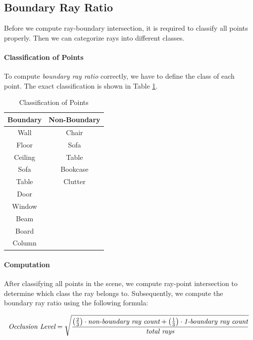 \documentclass[11pt, a4paper,oneside,chapterprefix=false]{scrbook}
\begin{document}
\subsection{Boundary Ray Ratio} \label{sec:boundary ray ratio}

Before we compute ray-boundary intersection, it is required to classify all points properly. Then we can categorize rays into different classes.

\paragraph{Classification of Points} To compute \emph{boundary ray ratio} correctly, we have to define the class of each point. The exact classification is shown in Table \ref{tab:classification of points}.
\begin{table}[H]
    \centering
    \begin{tabular}{|c|c|}
        \hline
        \textbf{Boundary} & \textbf{Non-Boundary} \\
        \hline
        Wall & Chair \\
        Floor & Sofa \\
        Ceiling & Table \\
        Sofa & Bookcase \\
        Table & Clutter \\
        Door &  \\
        Window & \\
        Beam & \\
        Board & \\
        Column & \\
        \hline
    \end{tabular}
    \caption{Classification of Points}
    \label{tab:classification of points}
\end{table}

\paragraph{Computation}

After classifying all points in the scene, we compute ray-point intersection to determine which class the ray belongs to. Subsequently, we compute the boundary ray ratio using the following formula:

\[
\emph{{Occlusion Level}} = \sqrt{\frac{{\left(\frac{2}{3}\right) \cdot \emph{{non-boundary ray count}} + \left(\frac{1}{3}\right) \cdot \emph{{1-boundary ray count}}}}{{\emph{{total rays}}}}}
\]
\end{document}
